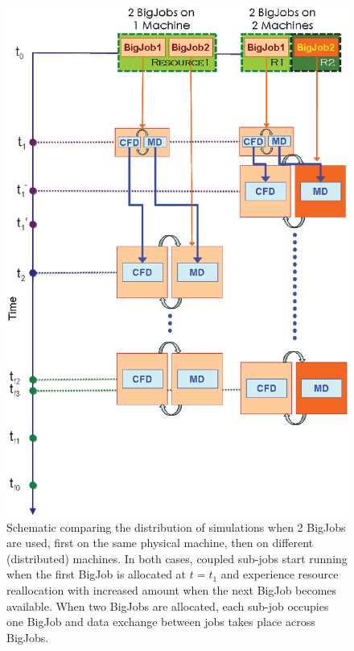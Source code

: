 \documentclass[conference,final]{IEEEtran}
\begin{document}
\begin{figure} \centering \includegraphics[scale=0.40]{Simulation_Time_of_Two_BigJobs.eps} \caption{\small Schematic comparing the distribution of simulations when 2 BigJobs are used, first on the same physical machine, then on different (distributed) machines. In both cases, coupled sub-jobs start running when the first BigJob is allocated at $t=t_1$ and experience resource reallocation with increased amount when the next BigJob becomes available. When two BigJobs are allocated, each sub-job occupies one BigJob and data exchange between jobs takes place across BigJobs.}  \label{Fig:TwoBigJobs} \end{figure}
\end{document}
